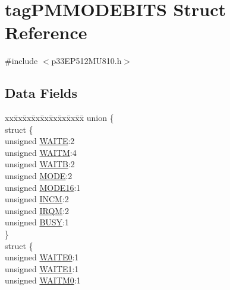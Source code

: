 \hypertarget{structtag_p_m_m_o_d_e_b_i_t_s}{}\section{tag\+P\+M\+M\+O\+D\+E\+B\+I\+TS Struct Reference}
\label{structtag_p_m_m_o_d_e_b_i_t_s}


{\ttfamily \#include $<$p33\+E\+P512\+M\+U810.\+h$>$}

\subsection*{Data Fields}
\begin{DoxyCompactItemize}
\item 
\begin{tabbing}
xx\=xx\=xx\=xx\=xx\=xx\=xx\=xx\=xx\=\kill
union \{\\
\>struct \{\\
\>\>unsigned \hyperlink{structtag_p_m_m_o_d_e_b_i_t_s_ab1f745f07f8dabb498e15e6fe0c2e65d}{WAITE}:2\\
\>\>unsigned \hyperlink{structtag_p_m_m_o_d_e_b_i_t_s_a42045e2868457b28258d1eb35a0b279c}{WAITM}:4\\
\>\>unsigned \hyperlink{structtag_p_m_m_o_d_e_b_i_t_s_ab0e9cd1164548d03639be6ebf27d1a72}{WAITB}:2\\
\>\>unsigned \hyperlink{structtag_p_m_m_o_d_e_b_i_t_s_adc56ba18ff3f1599c85d222bee624424}{MODE}:2\\
\>\>unsigned \hyperlink{structtag_p_m_m_o_d_e_b_i_t_s_ae096fb6fc65299accb5c75e3d306e425}{MODE16}:1\\
\>\>unsigned \hyperlink{structtag_p_m_m_o_d_e_b_i_t_s_aef0e40fad6106dbbd80d32be669eccea}{INCM}:2\\
\>\>unsigned \hyperlink{structtag_p_m_m_o_d_e_b_i_t_s_ace1f826858162b05b1bd2f02a43e6052}{IRQM}:2\\
\>\>unsigned \hyperlink{structtag_p_m_m_o_d_e_b_i_t_s_a6238b76e35d7ec0a6a944badc1c23d52}{BUSY}:1\\
\>\} \\
\>struct \{\\
\>\>unsigned \hyperlink{structtag_p_m_m_o_d_e_b_i_t_s_a367b098380d19d66b09b7d7b76780666}{WAITE0}:1\\
\>\>unsigned \hyperlink{structtag_p_m_m_o_d_e_b_i_t_s_ab84321e4d6646153d2482c1a5d36fccd}{WAITE1}:1\\
\>\>unsigned \hyperlink{structtag_p_m_m_o_d_e_b_i_t_s_ae02220dee571408aea73586774b31ca6}{WAITM0}:1\\

\end{tabbing}
\end{DoxyCompactItemize}
